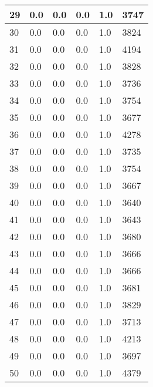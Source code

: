 \begin{longtable}{|l|l|l|l|l|l|}
29 & 0.0 & 0.0 & 0.0 & 1.0 & 3747 \\ \hline 
30 & 0.0 & 0.0 & 0.0 & 1.0 & 3824 \\ \hline 
31 & 0.0 & 0.0 & 0.0 & 1.0 & 4194 \\ \hline 
32 & 0.0 & 0.0 & 0.0 & 1.0 & 3828 \\ \hline 
33 & 0.0 & 0.0 & 0.0 & 1.0 & 3736 \\ \hline 
34 & 0.0 & 0.0 & 0.0 & 1.0 & 3754 \\ \hline 
35 & 0.0 & 0.0 & 0.0 & 1.0 & 3677 \\ \hline 
36 & 0.0 & 0.0 & 0.0 & 1.0 & 4278 \\ \hline 
37 & 0.0 & 0.0 & 0.0 & 1.0 & 3735 \\ \hline 
38 & 0.0 & 0.0 & 0.0 & 1.0 & 3754 \\ \hline 
39 & 0.0 & 0.0 & 0.0 & 1.0 & 3667 \\ \hline 
40 & 0.0 & 0.0 & 0.0 & 1.0 & 3640 \\ \hline 
41 & 0.0 & 0.0 & 0.0 & 1.0 & 3643 \\ \hline 
42 & 0.0 & 0.0 & 0.0 & 1.0 & 3680 \\ \hline 
43 & 0.0 & 0.0 & 0.0 & 1.0 & 3666 \\ \hline 
44 & 0.0 & 0.0 & 0.0 & 1.0 & 3666 \\ \hline 
45 & 0.0 & 0.0 & 0.0 & 1.0 & 3681 \\ \hline 
46 & 0.0 & 0.0 & 0.0 & 1.0 & 3829 \\ \hline 
47 & 0.0 & 0.0 & 0.0 & 1.0 & 3713 \\ \hline 
48 & 0.0 & 0.0 & 0.0 & 1.0 & 4213 \\ \hline 
49 & 0.0 & 0.0 & 0.0 & 1.0 & 3697 \\ \hline 
50 & 0.0 & 0.0 & 0.0 & 1.0 & 4379 \\ \hline 
\end{longtable}